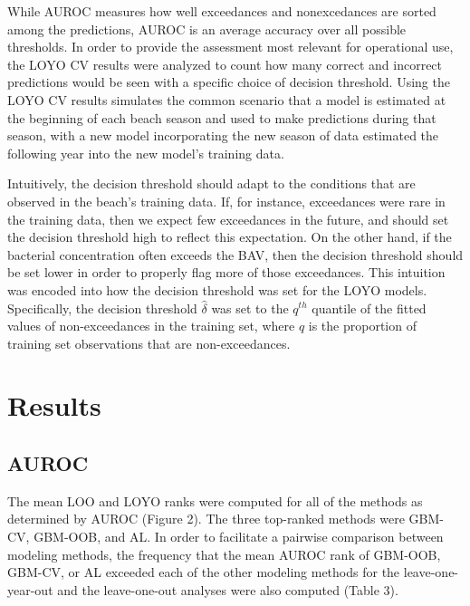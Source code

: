\documentclass[authoryear,review, 12pt]{elsarticle}
\begin{document}
While AUROC 
measures how well exceedances and nonexcedances are sorted among the
predictions, AUROC is an average accuracy over all possible thresholds.
In order to provide the assessment most relevant for operational use,
the LOYO CV results were analyzed to count how many correct and incorrect
predictions would be seen with a
specific choice of decision threshold. Using the LOYO CV results
simulates the common scenario that a model is estimated at the beginning
of each beach season and used to make predictions during that season,
with a new model incorporating the new season of data estimated the
following year into the new model's training data.

Intuitively, the decision threshold should adapt to the conditions that
are observed in the beach's training data. If, for instance, exceedances
were rare in the training data, then we expect few exceedances in the
future, and should set the decision threshold high to reflect this
expectation. On the other hand, if the bacterial concentration often
exceeds the BAV, then the decision threshold should be set lower in
order to properly flag more of those exceedances. This intuition was
encoded into how the decision threshold was set for the LOYO models.
Specifically, the decision threshold \(\hat{\delta}\) was set to the
\(q^{th}\) quantile of the fitted values of non-exceedances in the
training set, where \(q\) is the proportion of training set observations
that are non-exceedances.

\section{Results}\label{results}

\subsection{AUROC}\label{auroc}

The mean LOO and LOYO ranks were computed for all of the methods as
determined by AUROC (Figure 2). The three top-ranked methods were
GBM-CV, GBM-OOB, and AL. In order to facilitate a pairwise comparison
between modeling methods, the frequency that the mean AUROC rank of
GBM-OOB, GBM-CV, or AL exceeded each of the other modeling methods for
the leave-one-year-out and the leave-one-out analyses were also computed
(Table 3).
\end{document}

